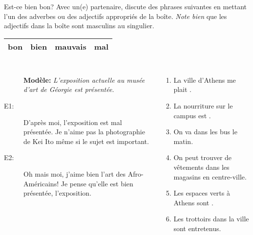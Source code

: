 \begin{frame}{Est-ce bien bon?}
  \small
  Avec un(e) partenaire, discute des phrases suivantes en mettant  l'un des adverbes ou des adjectifs appropriés de la boîte.
  \emph{Note bien} que les adjectifs dans la boîte sont masculins au singulier.
  \begin{center}
    \begin{tabular}{| l l l l |}
      \hline
      bon & bien & mauvais & mal \\
      \hline
    \end{tabular}
  \end{center}
  \begin{columns}[t]
    \scriptsize
      \begin{description}
        \item[] \textbf{Modèle:} \emph{L'exposition actuelle au musée d'art de Géorgie est \underline{\hspace{1.25cm}} présentée.}
        \item[E1:] D'après moi, l'exposition est \alert{mal} présentée. Je n'aime pas la photographie de Kei Ito même si le sujet est important.
        \item[E2:] Oh mais moi, j'aime bien l'art des Afro-Américains! Je pense qu'elle est \alert{bien} présentée, l'exposition.
      \end{description}
      \begin{enumerate}
        \item La ville d'Athens me plait \underline{\hspace{1.25cm}}.
        \item La nourriture sur le campus est \underline{\hspace{1.25cm}}.
        \item On va \underline{\hspace{1.25cm}} dans les bus le matin.
        \item On peut trouver de \underline{\hspace{1.25cm}} vêtements dans les magasins en centre-ville.
        \item Les espaces verts à Athens sont \underline{\hspace{1.25cm}}.
        \item Les trottoirs dans la ville sont \underline{\hspace{1.25cm}} entretenus.
      \end{enumerate}
  \end{columns}
\end{frame}